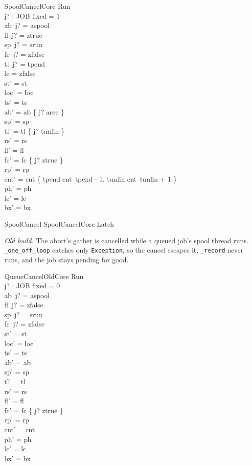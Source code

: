 \documentclass[a4paper,10pt,fleqn]{article}
\newcommand{\field}[1]{\texttt{#1}}
\begin{document}
\begin{schema}{SpoolCancelCore}
\Delta Run \\ j? : JOB
\where
fixed = 1 \\
ab~j? = aspool \\
fl~j? = ztrue \\
sp~j? = srun \\
fc~j? = zfalse \\
tl~j? = tpend \\
lc = zfalse \\
st' = st \\
loc' = loc \\
ts' = ts \\
ab' = ab \oplus \{ j? \mapsto arec \} \\
sp' = sp \\
tl' = tl \oplus \{ j? \mapsto tunfin \} \\
rs' = rs \\
fl' = fl \\
fc' = fc \oplus \{ j? \mapsto ztrue \} \\
rp' = rp \\
cnt' = cnt \oplus \{ tpend \mapsto cnt~tpend - 1, tunfin \mapsto cnt~tunfin + 1 \} \\
ph' = ph \\
lc' = lc \\
bx' = bx
\end{schema}

\begin{zed}
SpoolCancel  SpoolCancelCore \land Latch
\end{zed}

\emph{Old build.} The abort's gather is cancelled while a queued job's spool
thread runs. \field{\_one\_off\_loop} catches only \field{Exception}, so the
cancel escapes it, \field{\_record} never runs, and the job stays pending for good.

\begin{schema}{QueueCancelOldCore}
\Delta Run \\ j? : JOB
\where
fixed = 0 \\
ab~j? = aspool \\
fl~j? = zfalse \\
sp~j? = srun \\
fc~j? = zfalse \\
st' = st \\
loc' = loc \\
ts' = ts \\
ab' = ab \\
sp' = sp \\
tl' = tl \\
rs' = rs \\
fl' = fl \\
fc' = fc \oplus \{ j? \mapsto ztrue \} \\
rp' = rp \\
cnt' = cnt \\
ph' = ph \\
lc' = lc \\
bx' = bx
\end{schema}
\end{document}
